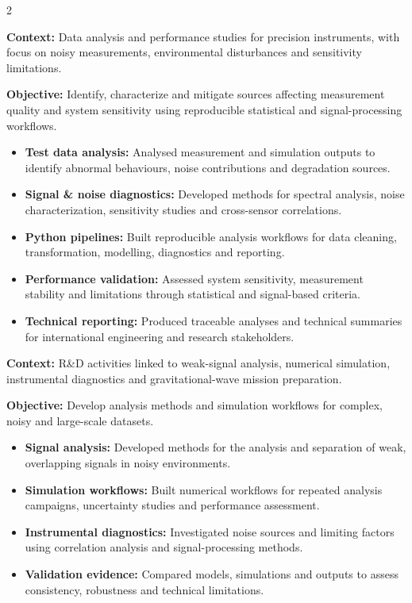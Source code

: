 \documentclass[8pt,a4paper,ragged2e,withhyper]{altacv}
\begin{document}
\begin{paracol}{2}

\textbf{Context:} Data analysis and performance studies for precision instruments, with focus on noisy measurements, environmental disturbances and sensitivity limitations.

\textbf{Objective:} Identify, characterize and mitigate sources affecting measurement quality and system sensitivity using reproducible statistical and signal-processing workflows.

\begin{itemize}
  \item \textbf{Test data analysis:} Analysed measurement and simulation outputs to identify abnormal behaviours, noise contributions and degradation sources.
  \item \textbf{Signal \& noise diagnostics:} Developed methods for spectral analysis, noise characterization, sensitivity studies and cross-sensor correlations.
  \item \textbf{Python pipelines:} Built reproducible analysis workflows for data cleaning, transformation, modelling, diagnostics and reporting.
  \item \textbf{Performance validation:} Assessed system sensitivity, measurement stability and limitations through statistical and signal-based criteria.
  \item \textbf{Technical reporting:} Produced traceable analyses and technical summaries for international engineering and research stakeholders.
\end{itemize}

\divider


\textbf{Context:} R\&D activities linked to weak-signal analysis, numerical simulation, instrumental diagnostics and gravitational-wave mission preparation.

\textbf{Objective:} Develop analysis methods and simulation workflows for complex, noisy and large-scale datasets.

\begin{itemize}
  \item \textbf{Signal analysis:} Developed methods for the analysis and separation of weak, overlapping signals in noisy environments.
  \item \textbf{Simulation workflows:} Built numerical workflows for repeated analysis campaigns, uncertainty studies and performance assessment.
  \item \textbf{Instrumental diagnostics:} Investigated noise sources and limiting factors using correlation analysis and signal-processing methods.
  \item \textbf{Validation evidence:} Compared models, simulations and outputs to assess consistency, robustness and technical limitations.
\end{itemize}


\end{paracol}
\end{document}
